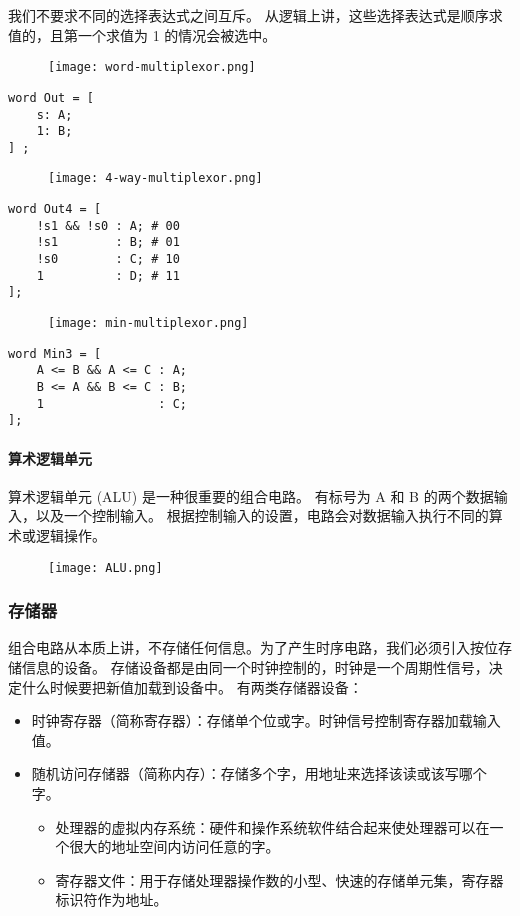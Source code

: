 我们不要求不同的选择表达式之间互斥。
从逻辑上讲，这些选择表达式是顺序求值的，且第一个求值为 1 的情况会被选中。
\begin{figure}[H]
    \centering
    \texttt{[image: word-multiplexor.png]}
\end{figure}
\begin{lstlisting}[style=CStyle]
word Out = [
    s: A;
    1: B;
] ;
\end{lstlisting}
\begin{figure}[H]
    \centering
    \texttt{[image: 4-way-multiplexor.png]}
\end{figure}
\begin{lstlisting}[style=CStyle]
word Out4 = [
    !s1 && !s0 : A; # 00
    !s1        : B; # 01
    !s0        : C; # 10
    1          : D; # 11
];
\end{lstlisting}
\begin{figure}[H]
    \centering
    \texttt{[image: min-multiplexor.png]}
\end{figure}
\begin{lstlisting}[style=CStyle]
word Min3 = [
    A <= B && A <= C : A;
    B <= A && B <= C : B;
    1                : C;
];
\end{lstlisting}

\paragraph{算术逻辑单元}

算术逻辑单元 (ALU) 是一种很重要的组合电路。
有标号为 A 和 B 的两个数据输入，以及一个控制输入。
根据控制输入的设置，电路会对数据输入执行不同的算术或逻辑操作。

\begin{figure}[H]
    \centering
    \texttt{[image: ALU.png]}
\end{figure}


\subsubsection{存储器}
组合电路从本质上讲，不存储任何信息。为了产生时序电路，我们必须引入按位存储信息的设备。
存储设备都是由同一个时钟控制的，时钟是一个周期性信号，决定什么时候要把新值加载到设备中。
有两类存储器设备：
\begin{itemize}
    \item 时钟寄存器（简称寄存器）：存储单个位或字。时钟信号控制寄存器加载输入值。
    \item 随机访问存储器（简称内存）：存储多个字，用地址来选择该读或该写哪个字。
    \begin{itemize}
        \item 处理器的虚拟内存系统：硬件和操作系统软件结合起来使处理器可以在一个很大的地址空间内访问任意的字。
        \item 寄存器文件：用于存储处理器操作数的小型、快速的存储单元集，寄存器标识符作为地址。
    \end{itemize}
\end{itemize}

